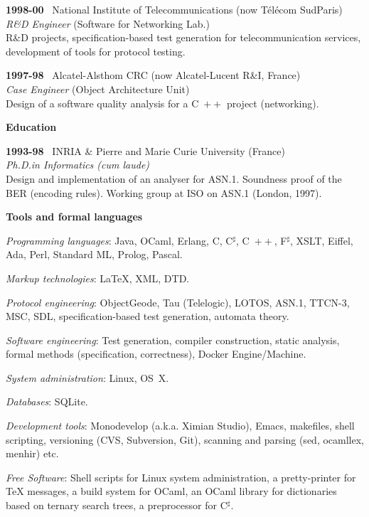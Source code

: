 \documentclass[a4paper,11pt]{article}
\newcommand{\cpp}{\mbox{C \hspace*{-2.5mm} \raise 0.7mm \hbox{${\scriptscriptstyle ++}$}}}
\begin{document}
\bigskip

\noindent\textbf{1998-00} \ \textsf{National Institute of
  Telecommunications} (now T\'el\'ecom SudParis)\\ \emph{R\&D
  Engineer} (Software for Networking Lab.)\\ R\&D projects,
specification-based test generation for telecommunication services,
development of tools for protocol testing.

\bigskip

\noindent\textbf{1997-98} \ \textsf{Alcatel-Alsthom CRC} (now
Alcatel-Lucent R\&I, France)\\ \emph{Case Engineer} (Object
Architecture Unit)\\ Design of a software quality analysis for a
\cpp{} project (networking).

\bigskip
\noindent\textbf{\large Education}
\bigskip

\noindent\textbf{1993-98} \ \textsf{INRIA \& Pierre and Marie Curie
  University} (France)\\ \emph{Ph.D.\@ in Informatics (cum
  laude)}\\ Design and implementation of an analyser for
ASN.1. Soundness proof of the BER (encoding rules). Working group at
ISO on ASN.1 (London, 1997).

\bigskip
\noindent\textbf{\large Tools and formal languages}
\medskip
\begin{itemize*}

  \item \textit{Programming languages}: Java, OCaml, Erlang, C,
    C$^\sharp$, \cpp, F$^\sharp$, XSLT, Eiffel, Ada, Perl, Standard
    ML, Prolog, Pascal.

  \item \textit{Markup technologies}: \LaTeX, XML, DTD.

  \item \textit{Protocol engineering}: ObjectGeode, Tau (Telelogic),
    LOTOS, ASN.1, TTCN-3, MSC, SDL, specification-based test
    generation, automata theory.

  \item \textit{Software engineering}: Test generation, compiler
    construction, static analysis, formal methods (specification,
    correctness), Docker Engine/Machine.

  \item \textit{System administration}: Linux, OS~X.

  \item \textit{Databases}: SQLite.

  \item \textit{Development tools}: Monodevelop (a.k.a. Ximian
    Studio), Emacs, makefiles, shell scripting, versioning (CVS,
    Subversion, Git), scanning and parsing (sed, ocamllex, menhir)
    etc.

  \item \textit{Free Software}: Shell scripts for Linux system
    administration, a pretty\hyp{}printer for \TeX{} messages, a build
    system for OCaml, an OCaml library for dictionaries based on
    ternary search trees, a preprocessor for C$^\sharp$.

\end{itemize*}
\end{document}
